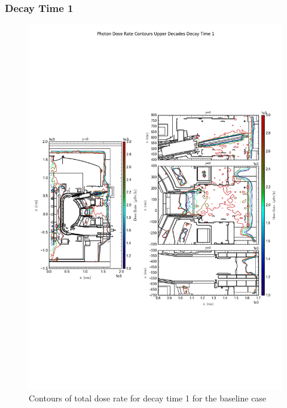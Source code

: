 \documentclass[12pt]{article}
\begin{document}
\newpage
\clearpage

\subsubsection*{Decay Time 1}
\begin{figure}[ht!]
\centering
\includegraphics[trim={0cm 8cm, 0cm 8cm},clip,scale=0.6]{../plots/final_model/Photon_Dose_Rate_Contours_Upper_Decades_Decay_Time_1.png}
\caption{Contours of total dose rate for decay time 1 for the baseline case}
\label{fig:photons_dc1_nob4c_contours}
\end{figure}
\end{document}
